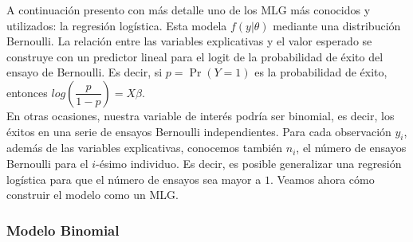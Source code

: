 A continuación presento con más detalle uno de los MLG más conocidos y utilizados: la regresión logística. Esta modela $f(y|\theta)$ mediante una distribución Bernoulli. La relación entre las variables explicativas y el valor esperado se construye con un predictor lineal para el logit de la probabilidad de éxito del ensayo de Bernoulli. Es decir, si $p = \Pr(Y=1)$ es la probabilidad de éxito, entonces $log\left(\dfrac{p}{1-p}\right)=X\beta$.\\ 

En otras ocasiones, nuestra variable de interés podría ser binomial, es decir, los éxitos en una serie de ensayos Bernoulli independientes. Para cada observación $y_i$, además de las variables explicativas, conocemos también $n_i$, el número de ensayos Bernoulli para el $i$-ésimo individuo. Es decir, es posible generalizar una regresión logística para que el número de ensayos sea mayor a $1$. Veamos ahora cómo construir el modelo como un MLG.

\subsubsection*{Modelo Binomial}

